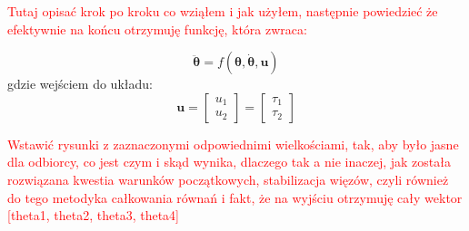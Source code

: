 \textcolor{red}{Tutaj opisać krok po kroku co wziąłem i jak użyłem, następnie powiedzieć że efektywnie na końcu otrzymuję funkcję, która zwraca:}

\begin{equation}
    \label{eq:system}
        \boldsymbol{\ddot \theta} = f(\boldsymbol{\theta},\boldsymbol{\dot \theta}, \boldsymbol{u})
\end{equation}
gdzie wejściem do układu:
\begin{equation}
    \label{eq:u_in}
        \boldsymbol{u} = 
        \begin{bmatrix}
            u_1\\u_2
        \end{bmatrix}
        =
        \begin{bmatrix}
            \tau_1\\\tau_2
        \end{bmatrix}
\end{equation}

\textcolor{red}{Wstawić rysunki z zaznaczonymi odpowiednimi wielkościami, tak, aby było jasne dla odbiorcy, co jest czym i skąd wynika, dlaczego tak a nie inaczej, jak została rozwiązana kwestia warunków początkowych, stabilizacja więzów, czyli również do tego metodyka całkowania równań i fakt, że na wyjściu otrzymuję cały wektor [theta1, theta2, theta3, theta4]}




